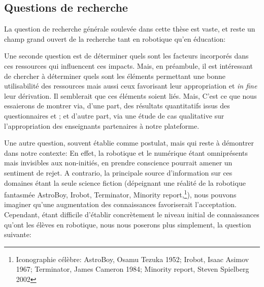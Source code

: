 \subsection*{Questions de recherche}
    La question de recherche générale soulevée dans cette thèse est vaste, et reste un champ grand ouvert de la recherche tant en robotique qu'en éducation:\par%
    \par%
    Une seconde question est de déterminer quels sont les facteurs incorporés dans ces ressources qui influencent ces impacts. Mais, en préambule, il est intéressant de chercher à déterminer quels sont les éléments permettant une bonne utilisabilité des ressources mais aussi ceux favorisant leur appropriation et \textit{in fine} leur dérivation.
    Il semblerait que ces éléments soient liés. Mais,
    C'est ce que nous essaierons de montrer via, d'une part, des résultats quantitatifs issus des questionnaires  et ; et d'autre part, via une étude de cas qualitative sur l'appropriation des enseignants partenaires à notre plateforme.\par%
    Une autre question, souvent établie comme postulat, mais qui reste à démontrer dans notre contexte:
    En effet, la robotique et le numérique étant omniprésents mais invisibles aux non-initiés, en prendre conscience pourrait amener un sentiment de rejet. A contrario, la principale source d'information sur ces domaines étant  la seule science fiction (dépeignant une réalité de la robotique fantasmée \eg AstroBoy, Irobot, Terminator, Minority report,\etc\footnote{Iconographie célèbre: AstroBoy, Osamu Tezuka 1952; Irobot, Isaac Asimov 1967; Terminator, James Cameron 1984; Minority report, Steven Spielberg 2002}), nous pouvons imaginer qu'une augmentation des connaissances favoriserait l'acceptation.
    Cependant, étant difficile d'établir concrètement le niveau initial de connaissances qu'ont les élèves en robotique, nous nous poserons plus simplement, la question suivante:
